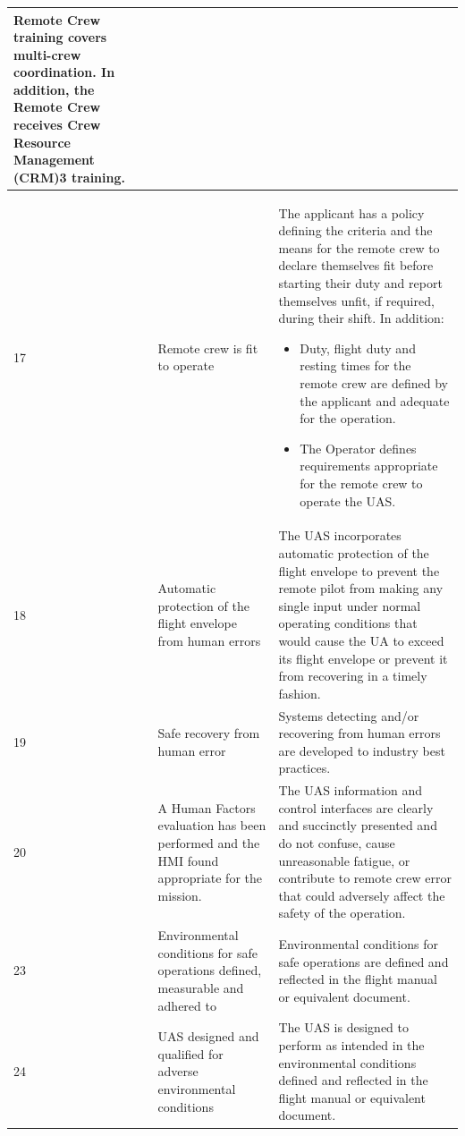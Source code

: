 \begin{longtable}{|p{0.5cm}|p{3cm}|p{\dimexpr\textwidth-3.5cm-6\tabcolsep-4\arrayrulewidth\relax}|}
Remote Crew training covers multi-crew coordination. In addition, the Remote
Crew receives Crew Resource Management (CRM)3 training. \\ \hline

17 & Remote crew is fit to operate & The applicant has a policy defining the
criteria and the means for the remote crew to declare themselves fit before
starting their duty and report themselves unfit, if required, during their shift. In addition:
\begin{itemize}
\item Duty, flight duty and resting times for the remote crew are defined by
the applicant and adequate for the operation.
\item The Operator defines requirements appropriate for the remote crew to
operate the UAS.
\end{itemize}   \\ \hline

18 & Automatic protection of the flight envelope from human errors & The UAS incorporates automatic protection of the flight envelope to prevent the remote pilot from making any single input under normal operating conditions that would cause the UA to exceed its flight envelope or prevent it from recovering in a timely fashion. \\ \hline

19 & Safe recovery from human error & Systems detecting and/or recovering
from human errors are developed to industry best practices. \\ \hline

20 & A Human Factors evaluation has been performed and the HMI found appropriate for the mission.  & The UAS information and control interfaces are clearly and succinctly presented and do not confuse, cause unreasonable fatigue, or contribute to remote crew error that could adversely affect the safety of the operation. \\ \hline

23 & Environmental conditions for safe operations defined,
measurable and adhered to & Environmental conditions for safe operations are defined and reflected in the flight manual or equivalent document. \\ \hline

24 & UAS designed and qualified for adverse environmental
conditions & The UAS is designed to perform as intended in the environmental
conditions defined and reflected in the flight manual or equivalent document. \\ \hline

\end{longtable}


